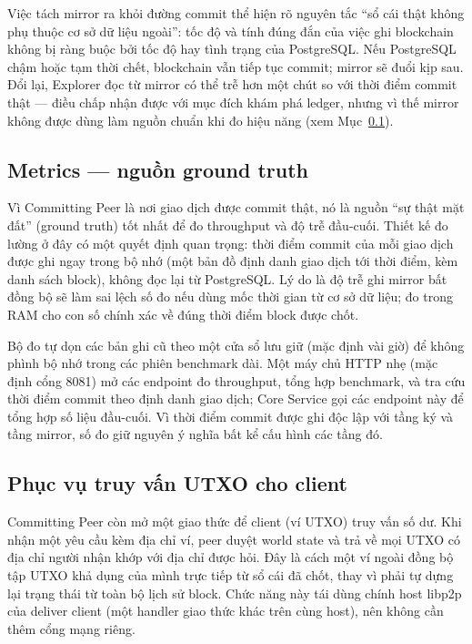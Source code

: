 Việc tách mirror ra khỏi đường commit thể hiện rõ nguyên tắc ``sổ cái thật
không phụ thuộc cơ sở dữ liệu ngoài'': tốc độ và tính đúng đắn của việc ghi
blockchain không bị ràng buộc bởi tốc độ hay tình trạng của PostgreSQL. Nếu
PostgreSQL chậm hoặc tạm thời chết, blockchain vẫn tiếp tục commit; mirror sẽ
đuổi kịp sau. Đổi lại, Explorer đọc từ mirror có thể trễ hơn một chút so với
thời điểm commit thật --- điều chấp nhận được với mục đích khám phá ledger,
nhưng vì thế mirror không được dùng làm nguồn chuẩn khi đo hiệu năng (xem
Mục~\ref{sec:cp-metrics}).

\subsection{Metrics --- nguồn ground truth}
\label{sec:cp-metrics}

Vì Committing Peer là nơi giao dịch được commit thật, nó là nguồn ``sự thật
mặt đất'' (ground truth) tốt nhất để đo throughput và độ trễ đầu-cuối. Thiết
kế đo lường ở đây có một quyết định quan trọng: thời điểm commit của mỗi
giao dịch được ghi ngay trong bộ nhớ (một bản đồ định danh giao dịch tới thời
điểm, kèm danh sách block), không đọc lại từ PostgreSQL. Lý do là độ trễ ghi
mirror bất đồng bộ sẽ làm sai lệch số đo nếu dùng mốc thời gian từ cơ sở dữ
liệu; đo trong RAM cho con số chính xác về đúng thời điểm block được chốt.

Bộ đo tự dọn các bản ghi cũ theo một cửa sổ lưu giữ (mặc định vài giờ) để
không phình bộ nhớ trong các phiên benchmark dài. Một máy chủ HTTP nhẹ (mặc
định cổng 8081) mở các endpoint đo throughput, tổng hợp benchmark, và tra cứu
thời điểm commit theo định danh giao dịch; Core Service gọi các endpoint này
để tổng hợp số liệu đầu-cuối. Vì thời điểm commit được ghi độc lập với tầng
ký và tầng mirror, số đo giữ nguyên ý nghĩa bất kể cấu hình các tầng đó.

\subsection{Phục vụ truy vấn UTXO cho client}
\label{sec:cp-query}

Committing Peer còn mở một giao thức để client (ví UTXO) truy vấn số dư. Khi
nhận một yêu cầu kèm địa chỉ ví, peer duyệt world state và trả về mọi UTXO có
địa chỉ người nhận khớp với địa chỉ được hỏi. Đây là cách một ví ngoài đồng
bộ tập UTXO khả dụng của mình trực tiếp từ sổ cái đã chốt, thay vì phải tự
dựng lại trạng thái từ toàn bộ lịch sử block. Chức năng này tái dùng chính
host libp2p của deliver client (một handler giao thức khác trên cùng host),
nên không cần thêm cổng mạng riêng.

